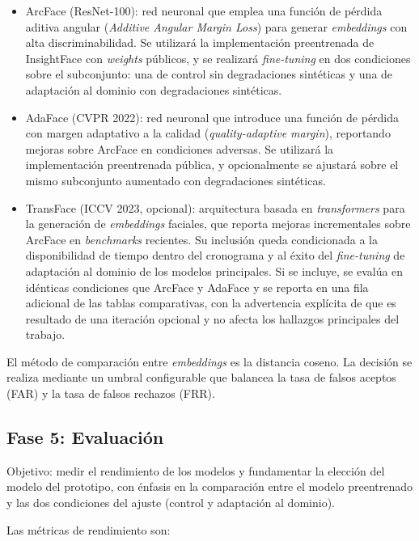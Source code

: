 \documentclass[
  11pt, %
]{charter}
\begin{document}
\begin{itemize}
  \item ArcFace (ResNet-100): red neuronal que emplea una función de pérdida aditiva angular (\textit{Additive Angular Margin Loss}) para generar \textit{embeddings} con alta discriminabilidad. Se utilizará la implementación preentrenada de InsightFace con \textit{weights} públicos, y se realizará \textit{fine-tuning} en dos condiciones sobre el subconjunto: una de control sin degradaciones sintéticas y una de adaptación al dominio con degradaciones sintéticas.
  \item AdaFace (CVPR 2022): red neuronal que introduce una función de pérdida con margen adaptativo a la calidad (\textit{quality-adaptive margin}), reportando mejoras sobre ArcFace en condiciones adversas. Se utilizará la implementación preentrenada pública, y opcionalmente se ajustará sobre el mismo subconjunto aumentado con degradaciones sintéticas.
  \item TransFace (ICCV 2023, opcional): arquitectura basada en \textit{transformers} para la generación de \textit{embeddings} faciales, que reporta mejoras incrementales sobre ArcFace en \textit{benchmarks} recientes. Su inclusión queda condicionada a la disponibilidad de tiempo dentro del cronograma y al éxito del \textit{fine-tuning} de adaptación al dominio de los modelos principales. Si se incluye, se evalúa en idénticas condiciones que ArcFace y AdaFace y se reporta en una fila adicional de las tablas comparativas, con la advertencia explícita de que es resultado de una iteración opcional y no afecta los hallazgos principales del trabajo.
\end{itemize}

El método de comparación entre \textit{embeddings} es la distancia coseno. La decisión se realiza mediante un umbral configurable que balancea la tasa de falsos aceptos (FAR) y la tasa de falsos rechazos (FRR).

\subsection{Fase 5: Evaluación}

Objetivo: medir el rendimiento de los modelos y fundamentar la elección del modelo del prototipo, con énfasis en la comparación entre el modelo preentrenado y las dos condiciones del ajuste (control y adaptación al dominio).

Las métricas de rendimiento son:
\end{document}
